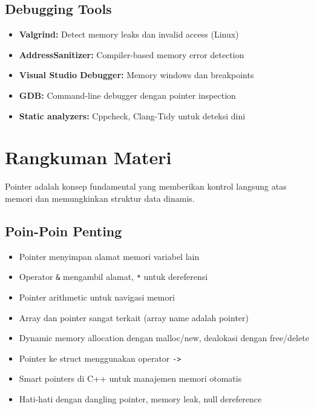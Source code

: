 \documentclass[../main.tex]{subfiles}
\begin{document}
\subsection{Debugging Tools}

\begin{itemize}
  \item \textbf{Valgrind:} Detect memory leaks dan invalid access (Linux) \parencite{valgrind}
  \item \textbf{AddressSanitizer:} Compiler-based memory error detection \parencite{addresssanitizer}
  \item \textbf{Visual Studio Debugger:} Memory windows dan breakpoints
  \item \textbf{GDB:} Command-line debugger dengan pointer inspection
  \item \textbf{Static analyzers:} Cppcheck, Clang-Tidy untuk deteksi dini
\end{itemize}

\section{Rangkuman Materi}

Pointer adalah konsep fundamental yang memberikan kontrol langsung atas memori dan memungkinkan struktur data dinamis.

\subsection{Poin-Poin Penting}

\begin{itemize}
  \item Pointer menyimpan alamat memori variabel lain
  \item Operator \texttt{\&} mengambil alamat, \texttt{*} untuk dereferensi
  \item Pointer arithmetic untuk navigasi memori
  \item Array dan pointer sangat terkait (array name adalah pointer)
  \item Dynamic memory allocation dengan malloc/new, dealokasi dengan free/delete
  \item Pointer ke struct menggunakan operator \texttt{->}
  \item Smart pointers di C++ untuk manajemen memori otomatis
  \item Hati-hati dengan dangling pointer, memory leak, null dereference
\end{itemize}
\end{document}
